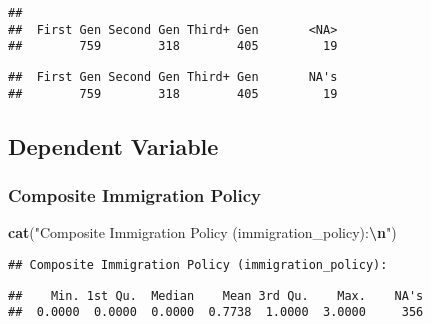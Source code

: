 \documentclass[
]{article}
\newenvironment{Shaded}{\begin{snugshade}}{\end{snugshade}}
\newcommand{\FunctionTok}[1]{\textcolor[rgb]{0.13,0.29,0.53}{\textbf{#1}}}
\newcommand{\NormalTok}[1]{#1}
\newcommand{\SpecialCharTok}[1]{\textcolor[rgb]{0.81,0.36,0.00}{\textbf{#1}}}
\newcommand{\StringTok}[1]{\textcolor[rgb]{0.31,0.60,0.02}{#1}}
\begin{document}
\begin{verbatim}
## 
##  First Gen Second Gen Third+ Gen       <NA> 
##        759        318        405         19
\end{verbatim}

\begin{Shaded}
\end{Shaded}

\begin{verbatim}
##  First Gen Second Gen Third+ Gen       NA's 
##        759        318        405         19
\end{verbatim}

\subsection{Dependent Variable}\label{dependent-variable}

\subsubsection{Composite Immigration
Policy}\label{composite-immigration-policy}

\begin{Shaded}
\begin{Highlighting}[]
\FunctionTok{cat}\NormalTok{(}\StringTok{"Composite Immigration Policy (immigration\_policy):}\SpecialCharTok{\textbackslash{}n}\StringTok{"}\NormalTok{)}
\end{Highlighting}
\end{Shaded}

\begin{verbatim}
## Composite Immigration Policy (immigration_policy):
\end{verbatim}

\begin{Shaded}
\end{Shaded}

\begin{verbatim}
##    Min. 1st Qu.  Median    Mean 3rd Qu.    Max.    NA's 
##  0.0000  0.0000  0.0000  0.7738  1.0000  3.0000     356
\end{verbatim}
\end{document}
